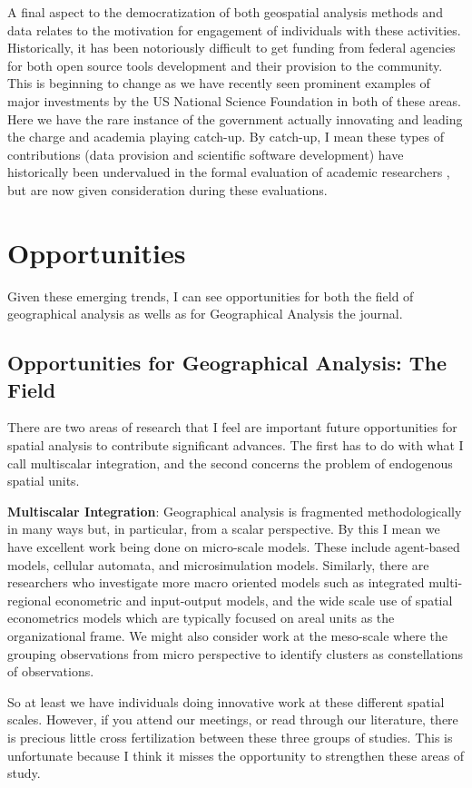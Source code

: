 \documentclass[11pt]{article}
\begin{document}
A final aspect to the democratization of both geospatial analysis methods and
data relates to the motivation for engagement of individuals with these activities.
Historically, it has been notoriously difficult to get funding from federal
agencies for both open source tools development and their provision to the
community. This is beginning to change as we have recently seen prominent
examples of major investments by the US National Science Foundation in both of
these areas. Here we have the rare instance of the government actually
innovating and leading the charge and academia playing catch-up. By catch-up, I
mean these types of contributions (data provision and scientific
software development) have historically been undervalued in the formal
evaluation of academic researchers \cite{eghbal2016roads}, but are now given
consideration during these evaluations.

\section{Opportunities}
\label{sec:org000df0f}
Given these emerging trends, I can see opportunities for both the field of
geographical analysis as wells as for Geographical Analysis the journal.
\subsection{Opportunities for Geographical Analysis: The Field}
\label{sec:org52b49a6}
There are two areas of research that I feel are important future
opportunities for spatial analysis to contribute significant advances. The
first has to do with what I call multiscalar integration, and the second
concerns the problem of endogenous spatial units.

\textbf{Multiscalar Integration}: Geographical analysis is fragmented methodologically
in many ways but, in particular, from a scalar perspective. By this I mean we
have excellent work being done on micro-scale models. These include agent-based
models, cellular automata, and microsimulation models. Similarly, there are
researchers who investigate more macro oriented models such as integrated
multi-regional econometric and input-output models, and the wide scale use of
spatial econometrics models which are typically focused on areal units as the
organizational frame. We might also consider work at the meso-scale where
the grouping observations from micro perspective to identify clusters
as constellations of observations.

So at least we have individuals doing innovative work at these
different spatial scales. However, if you attend our meetings, or read through
our literature, there is precious little cross fertilization between these
three groups of studies. This is unfortunate because I think it misses the
opportunity to strengthen these areas of study.
\end{document}
